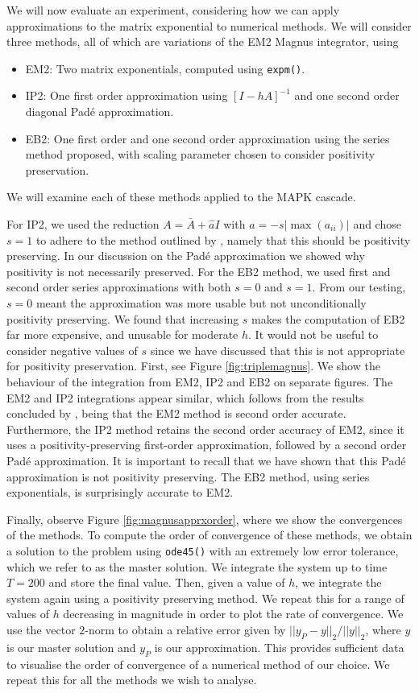 We will now evaluate an experiment, considering how we can apply approximations to the matrix exponential to numerical methods.
We will consider three methods, all of which are variations of the EM2 Magnus integrator, using
\begin{itemize}
    \item EM2: Two matrix exponentials, computed using \texttt{expm()}.
    \item IP2: One first order approximation using $[I-hA]^{-1}$ and one second order diagonal Pad\'e approximation.
    \item EB2: One first order and one second order approximation using the series method proposed, with scaling parameter chosen to consider positivity preservation. 
\end{itemize}
We will examine each of these methods applied to the MAPK cascade.

For IP2, we used the reduction $A = \bar{A} + \hat{a}I$ with $a = -s |\max(a_{ii})|$ and chose $s=1$ to adhere to the method outlined by \cite{blanes_pos_2022},
namely that this should be positivity preserving. In our discussion on the Pad\'e approximation we showed why positivity is not necessarily preserved.
For the EB2 method, we used first and second order series approximations with both $s=0$ and $s=1$.
From our testing, $s=0$ meant the approximation was more usable but not unconditionally positivity preserving.
We found that increasing $s$ makes the computation of EB2 far more expensive, and unusable for moderate $h$.
It would not be useful to consider negative values of $s$ since we have discussed that this is not appropriate for positivity preservation.
First, see Figure \ref{fig:triplemagnus}. We show the behaviour of the integration from EM2, IP2 and EB2 on separate figures.
The EM2 and IP2 integrations appear similar, which follows from the results concluded by \cite{blanes_pos_2022},
being that the EM2 method is second order accurate.
Furthermore, the IP2 method retains the second order accuracy of EM2, since it uses a positivity-preserving first-order approximation, followed by a second order Pad\'e approximation. 
It is important to recall that we have shown that this Pad\'e approximation is not positivity preserving.
The EB2 method, using series exponentials, is surprisingly accurate to EM2.

Finally, observe Figure \ref{fig:magnusapprxorder}, where we show the convergences of the methods.
To compute the order of convergence of these methods, we obtain a solution to the problem using \texttt{ode45()} with an extremely low error tolerance,
which we refer to as the master solution.
We integrate the system up to time $T=200$ and store the final value.
Then, given a value of $h$, we integrate the system again using a positivity preserving method.
We repeat this for a range of values of $h$ decreasing in magnitude in order to plot the rate of convergence.
We use the vector $2$-norm to obtain a relative error given by $||y_P - y||_2 / ||y||_2$,
where $y$ is our master solution and $y_P$ is our approximation.
This provides sufficient data to visualise the order of convergence of a numerical method of our choice.
We repeat this for all the methods we wish to analyse.

